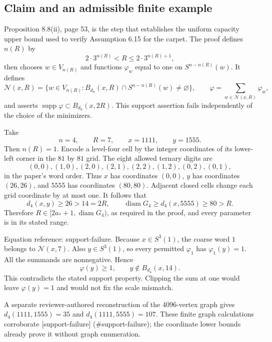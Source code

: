 \documentclass[10pt]{article}
\begin{document}
\subsection*{Claim and an admissible finite example}
Proposition 8.8(ii), page 53, is the step that establishes the uniform capacity upper bound used to verify Assumption 6.15 for the carpet. The proof defines \(n(R)\) by \[2\cdot3^{n(R)}<R\le2\cdot3^{n(R)+1},\] then chooses \(w\in V_{n(R)}\) and functions \(\varphi_w\) equal to one on \(S^{n-n(R)}(w)\). It defines \[\mathcal N(x,R)=
 \{w\in V_{n(R)}:B_{d_n}(x,R)\cap S^{n-n(R)}(w)\ne\varnothing\},
 \qquad
 \varphi=\sum_{w\in\mathcal N(x,R)}\varphi_w,\] and asserts \(\operatorname{supp}\varphi\subset B_{d_n}(x,2R)\). This support assertion fails independently of the choice of the minimizers.\par
Take \[n=4,\qquad R=7,\qquad x=1111,\qquad y=1555.\] Then \(n(R)=1\). Encode a level-four cell by the integer coordinates of its lower-left corner in the \(81\) by \(81\) grid. The eight allowed ternary digits are \[(0,0),(1,0),(2,0),(2,1),(2,2),(1,2),(0,2),(0,1),\] in the paper’s word order. Thus \(x\) has coordinates \((0,0)\), \(y\) has coordinates \((26,26)\), and \(5555\) has coordinates \((80,80)\). Adjacent closed cells change each grid coordinate by at most one. It follows that \[d_4(x,y)\ge26>14=2R,\qquad
 \operatorname{diam}G_4\ge d_4(x,5555)\ge80>R.\] Therefore \(R\in[2a_*+1,\operatorname{diam}G_4)\), as required in the proof, and every parameter is in its stated range.\par
Equation reference: support-failure. Because \(x\in S^3(1)\), the coarse word \(1\) belongs to \(\mathcal N(x,7)\). Also \(y\in S^3(1)\), so every permitted \(\varphi_1\) has \(\varphi_1(y)=1\). All the summands are nonnegative. Hence \[
 \varphi(y)\ge1,\qquad y\notin B_{d_4}(x,14).\] This contradicts the stated support property. Clipping the sum at one would leave \(\varphi(y)=1\) and would not fix the scale mismatch.\par
A separate reviewer-authored reconstruction of the 4096-vertex graph gives \(d_4(1111,1555)=35\) and \(d_4(1111,5555)=107\). These finite graph calculations corroborate [support-failure] (\#support-failure); the coordinate lower bounds already prove it without graph enumeration.\par
\end{document}
